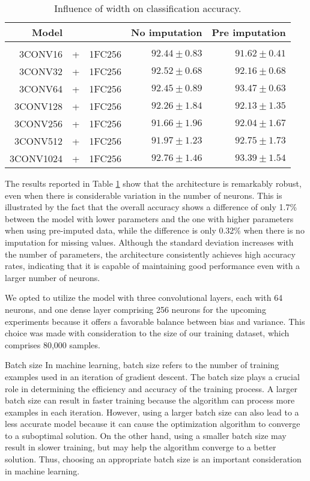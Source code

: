  \begin{table}[H]
  \centering
   \begin{tabular}{rclrr}
   Model&&                  & No imputation         & Pre imputation             \\[0.2cm]
   \hline \\[-0.2cm]
   3CONV16 &+& 1FC256    	 & $92.44 \pm 0.83$ 	 & $91.62 \pm 0.41$\\
   3CONV32 &+& 1FC256    	 & $92.52 \pm 0.68$ 	 & $92.16 \pm 0.68$\\
   3CONV64 &+& 1FC256    	 & $92.45 \pm 0.89$ 	 & $\mathbf{93.47 \pm 0.63}$\\
   3CONV128 &+& 1FC256   	 & $92.26 \pm 1.84$ 	 & $92.13 \pm 1.35$\\
   3CONV256 &+& 1FC256   	 & $91.66 \pm 1.96$ 	 & $92.04 \pm 1.67$\\
   3CONV512 &+& 1FC256   	 & $91.97 \pm 1.23$ 	 & $92.75 \pm 1.73$\\
   3CONV1024 &+& 1FC256  	 & $\mathbf{92.76 \pm 1.46}$ 	 & $93.39 \pm 1.54$\\
   \end{tabular}
   \caption{Influence of width on classification accuracy.}
   \label{tab:temCNNwidth}
 \end{table}

The results reported in Table \ref{tab:temCNNwidth} show that the architecture is remarkably robust, even when there is considerable variation in the number of neurons. This is illustrated by the fact that the overall accuracy shows a difference of only 1.7\% between the model with lower parameters and the one with higher parameters when using pre-imputed data, while the difference is only 0.32\% when there is no imputation for missing values.
Although the standard deviation increases with the number of parameters, the architecture consistently achieves high accuracy rates, indicating that it is capable of maintaining good performance even with a larger number of neurons.

We opted to utilize the model with three convolutional layers, each with 64 neurons, and one dense layer comprising 256 neurons for the upcoming experiments because it offers a favorable balance between bias and variance. This choice was made with consideration to the size of our training dataset, which comprises 80,000 samples.

\begin{paragraph}{Batch size}
In machine learning, batch size refers to the number of training examples used in an iteration of gradient descent.
The batch size plays a crucial role in determining the efficiency and accuracy of the training process.
A larger batch size can result in faster training because the algorithm can process more examples in each iteration.
However, using a larger batch size can also lead to a less accurate model because it can cause the optimization algorithm to converge to a suboptimal solution.
On the other hand, using a smaller batch size may result in slower training, but may help the algorithm converge to a better solution. 
Thus, choosing an appropriate batch size is an important consideration in machine learning.
\end{paragraph}

